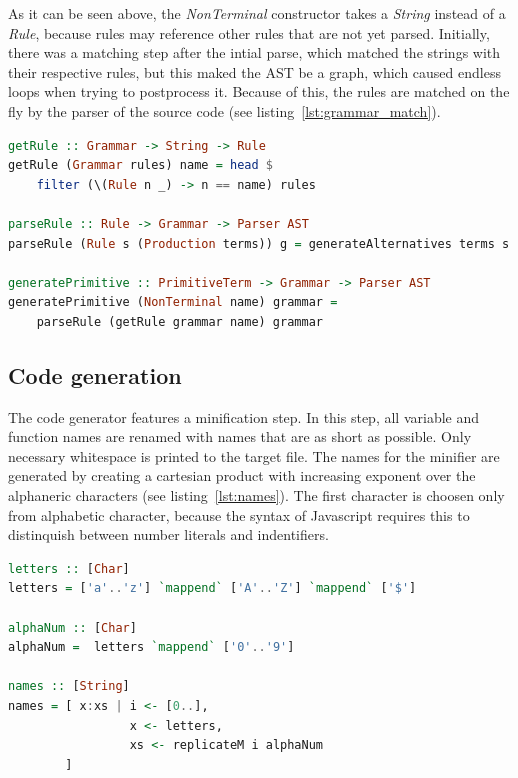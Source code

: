 As it can be seen above, the \textit{NonTerminal} constructor takes a \textit{String} instead of a \textit{Rule}, because rules may reference other rules that are not yet parsed. Initially, there was a matching step after the intial parse, which matched the strings with their respective rules, but this maked the AST be a graph, which caused endless loops when trying to postprocess it. Because of this, the rules are matched on the fly by the parser of the source code (see listing~\ref{lst:grammar_match}).

\begin{lstlisting}[linewidth=\columnwidth, caption={Rule matching while parsing}, captionpos=b, label=lst:grammar_match, language=Haskell, breaklines=true]
getRule :: Grammar -> String -> Rule
getRule (Grammar rules) name = head $
    filter (\(Rule n _) -> n == name) rules

parseRule :: Rule -> Grammar -> Parser AST
parseRule (Rule s (Production terms)) g = generateAlternatives terms s g

generatePrimitive :: PrimitiveTerm -> Grammar -> Parser AST
generatePrimitive (NonTerminal name) grammar =
    parseRule (getRule grammar name) grammar
\end{lstlisting}

\subsection{Code generation}

The code generator features a minification step. In this step, all variable and function names are renamed with names that are as short as possible. Only necessary whitespace is printed to the target file. The names for the minifier are generated by creating a cartesian product with increasing exponent over the alphaneric characters (see listing~\ref{lst:names}). The first character is choosen only from alphabetic character, because the syntax of Javascript requires this to distinquish between number literals and indentifiers.

\begin{lstlisting}[linewidth=\columnwidth, caption={Endless list of possible variable names}, captionpos=b, label=lst:names, language=Haskell, breaklines=true]
letters :: [Char]
letters = ['a'..'z'] `mappend` ['A'..'Z'] `mappend` ['$']

alphaNum :: [Char]
alphaNum =  letters `mappend` ['0'..'9']

names :: [String]
names = [ x:xs | i <- [0..],
                 x <- letters,
                 xs <- replicateM i alphaNum
        ]
\end{lstlisting}

